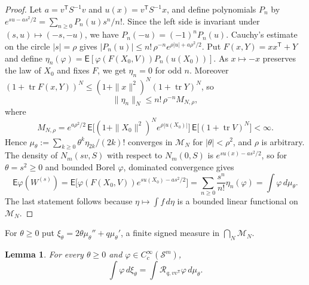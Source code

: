 \documentclass{amsart}
\newtheorem{lemma}[theorem]{Lemma}
\theoremstyle{definition}
\theoremstyle{remark}
\numberwithin{equation}{section}
\newcommand{\E}{\mathsf{E}}
\newcommand{\Sym}{\mathcal{S}}
\newcommand{\M}{\mathcal{M}}
\newcommand{\Rop}{\mathcal{R}}
\newcommand{\tr}{\operatorname{tr}}
\begin{document}
\begin{proof}
Let $a=v^{\mathsf T}S^{-1}v$ and $u(x)=v^{\mathsf T}S^{-1}x$, and define polynomials $P_n$ by $e^{su-as^2/2}=\sum_{n\ge0}P_n(u)s^n/n!$. Since the left side is invariant under $(s,u)\mapsto(-s,-u)$, we have $P_n(-u)=(-1)^nP_n(u)$. Cauchy's estimate on the circle $|s|=\rho$ gives $|P_n(u)|\le n!\,\rho^{-n}e^{\rho|u|+a\rho^2/2}$. Put $F(x,Y)=xx^{\mathsf T}+Y$ and define $\eta_n(\varphi)=\E[\varphi(F(X_0,V))P_n(u(X_0))]$. As $x\mapsto-x$ preserves the law of $X_0$ and fixes $F$, we get $\eta_n=0$ for odd $n$. Moreover $(1+\tr F(x,Y))^N\le(1+\|x\|^2)^N(1+\tr Y)^N$, so
\[
\|\eta_n\|_N\le n!\,\rho^{-n}M_{N,\rho},
\]
where
\[
M_{N,\rho}=e^{a\rho^2/2}\,\E\bigl[(1+\|X_0\|^2)^Ne^{\rho|u(X_0)|}\bigr]\,\E\bigl[(1+\tr V)^N\bigr]<\infty .
\]
Hence $\mu_\theta:=\sum_{k\ge0}\theta^k\eta_{2k}/(2k)!$ converges in $\M_N$ for $|\theta|<\rho^2$, and $\rho$ is arbitrary. The density of $N_m(sv,S)$ with respect to $N_m(0,S)$ is $e^{su(x)-as^2/2}$, so for $\theta=s^2\ge0$ and bounded Borel $\varphi$, dominated convergence gives
\[
\E\varphi(W^{(s)})=\E\bigl[\varphi(F(X_0,V))e^{su(X_0)-as^2/2}\bigr]=\sum_{n\ge0}\frac{s^n}{n!}\eta_n(\varphi)=\int\varphi\,d\mu_\theta .
\]
The last statement follows because $\eta\mapsto\int f\,d\eta$ is a bounded linear functional on $\M_N$.
\end{proof}

For $\theta\ge0$ put $\xi_\theta=2\theta\mu_\theta''+q\mu_\theta'$, a finite signed measure in $\bigcap_N\M_N$.

\begin{lemma}\label{lem:ode}
For every $\theta\ge0$ and $\varphi\in C_c^\infty(\Sym^m)$,
\begin{equation}\label{eq:odetest}
\int\varphi\,d\xi_\theta=\int\Rop_{q,vv^{\mathsf T}}\varphi\,d\mu_\theta .
\end{equation}
\end{lemma}
\end{document}
